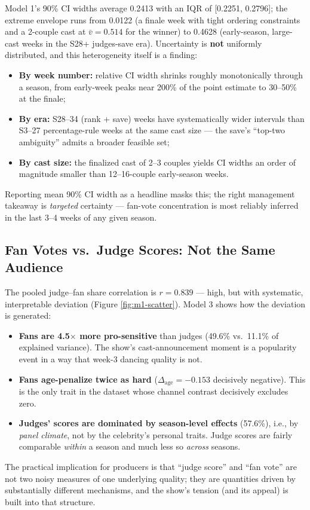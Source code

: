 \documentclass{article}
\begin{document}
Model 1's 90\% CI widths average 0.2413 with an IQR of [0.2251, 0.2796]; the extreme envelope runs from 0.0122 (a finale week with tight ordering constraints and a 2-couple cast at $\bar v = 0.514$ for the winner) to 0.4628 (early-season, large-cast weeks in the S28+ judges-save era). Uncertainty is \textbf{not} uniformly distributed, and this heterogeneity itself is a finding:
\begin{itemize}
  \item \textbf{By week number:} relative CI width shrinks roughly monotonically through a season, from early-week peaks near 200\% of the point estimate to 30--50\% at the finale;
  \item \textbf{By era:} S28--34 (rank + save) weeks have systematically wider intervals than S3--27 percentage-rule weeks at the same cast size --- the save's ``top-two ambiguity'' admits a broader feasible set;
  \item \textbf{By cast size:} the finalized cast of 2--3 couples yields CI widths an order of magnitude smaller than 12--16-couple early-season weeks.
\end{itemize}
Reporting mean 90\% CI width as a headline masks this; the right management takeaway is \emph{targeted} certainty --- fan-vote concentration is most reliably inferred in the last 3--4 weeks of any given season.

\subsection{Fan Votes vs.\ Judge Scores: Not the Same Audience}

The pooled judge--fan share correlation is $r = 0.839$ --- high, but with systematic, interpretable deviation (Figure \ref{fig:m1-scatter}). Model 3 shows how the deviation is generated:
\begin{itemize}
  \item \textbf{Fans are 4.5$\times$ more pro-sensitive} than judges (49.6\% vs.\ 11.1\% of explained variance). The show's cast-announcement moment is a popularity event in a way that week-3 dancing quality is not.
  \item \textbf{Fans age-penalize twice as hard} ($\Delta_{\text{age}} = -0.153$ decisively negative). This is the only trait in the dataset whose channel contrast decisively excludes zero.
  \item \textbf{Judges' scores are dominated by season-level effects} (57.6\%), i.e., by \emph{panel climate}, not by the celebrity's personal traits. Judge scores are fairly comparable \emph{within} a season and much less so \emph{across} seasons.
\end{itemize}
The practical implication for producers is that ``judge score'' and ``fan vote'' are not two noisy measures of one underlying quality; they are quantities driven by substantially different mechanisms, and the show's tension (and its appeal) is built into that structure.
\end{document}

